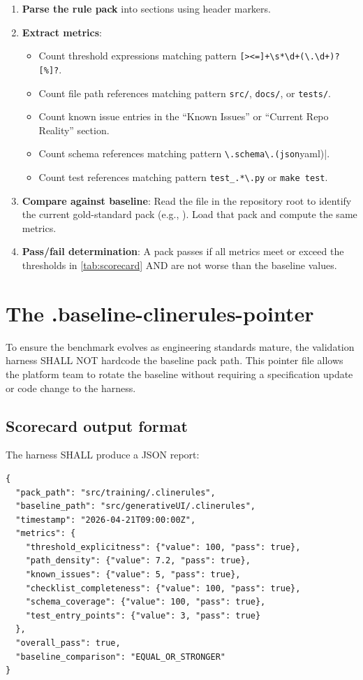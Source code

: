 \begin{enumerate}
  \item \textbf{Parse the rule pack} into sections using header markers.
  \item \textbf{Extract metrics}:
    \begin{itemize}
      \item Count threshold expressions matching pattern
        \verb|[><=]+\s*\d+(\.\d+)?[%]?|.
      \item Count file path references matching pattern
        \verb|src/|, \verb|docs/|, or \verb|tests/|.
      \item Count known issue entries in the ``Known Issues'' or
        ``Current Repo Reality'' section.
      \item Count schema references matching pattern
        \verb|\.schema\.(json|yaml)|.
      \item Count test references matching pattern
        \verb|test_.*\.py| or \verb|make test|.
    \end{itemize}
  \item \textbf{Compare against baseline}: Read the
     file in the repository root
    to identify the current gold-standard pack (e.g.,
    ). Load that pack and compute
    the same metrics.
  \item \textbf{Pass/fail determination}: A pack passes if all metrics
    meet or exceed the thresholds in \cref{tab:scorecard} AND are not
    worse than the baseline values.
\end{enumerate}

\section{The .baseline-clinerules-pointer}

To ensure the benchmark evolves as engineering standards mature, the
validation harness SHALL NOT hardcode the baseline pack path. This
pointer file allows the platform team to rotate the baseline without
requiring a specification update or code change to the harness.

\subsection{Scorecard output format}

The harness SHALL produce a JSON report:

\begin{verbatim}
{
  "pack_path": "src/training/.clinerules",
  "baseline_path": "src/generativeUI/.clinerules",
  "timestamp": "2026-04-21T09:00:00Z",
  "metrics": {
    "threshold_explicitness": {"value": 100, "pass": true},
    "path_density": {"value": 7.2, "pass": true},
    "known_issues": {"value": 5, "pass": true},
    "checklist_completeness": {"value": 100, "pass": true},
    "schema_coverage": {"value": 100, "pass": true},
    "test_entry_points": {"value": 3, "pass": true}
  },
  "overall_pass": true,
  "baseline_comparison": "EQUAL_OR_STRONGER"
}
\end{verbatim}


